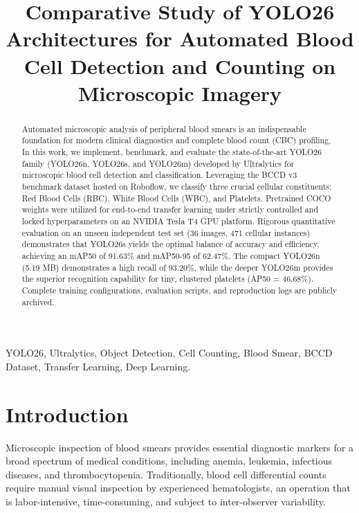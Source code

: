 \documentclass[conference]{IEEEtran}
\begin{document}
\title{Comparative Study of YOLO26 Architectures for Automated Blood Cell Detection and Counting on Microscopic Imagery}

\author{
}

\maketitle

\begin{abstract}
Automated microscopic analysis of peripheral blood smears is an indispensable foundation for modern clinical diagnostics and complete blood count (CBC) profiling. In this work, we implement, benchmark, and evaluate the state-of-the-art YOLO26 family (YOLO26n, YOLO26s, and YOLO26m) developed by Ultralytics for microscopic blood cell detection and classification. Leveraging the BCCD v3 benchmark dataset hosted on Roboflow, we classify three crucial cellular constituents: Red Blood Cells (RBC), White Blood Cells (WBC), and Platelets. Pretrained COCO weights were utilized for end-to-end transfer learning under strictly controlled and locked hyperparameters on an NVIDIA Tesla T4 GPU platform. Rigorous quantitative evaluation on an unseen independent test set (36 images, 471 cellular instances) demonstrates that YOLO26s yields the optimal balance of accuracy and efficiency, achieving an mAP50 of 91.63\% and mAP50-95 of 62.47\%. The compact YOLO26n (5.19 MB) demonstrates a high recall of 93.20\%, while the deeper YOLO26m provides the superior recognition capability for tiny, clustered platelets (AP50 = 46.68\%). Complete training configurations, evaluation scripts, and reproduction logs are publicly archived.
\end{abstract}

\begin{IEEEkeywords}
YOLO26, Ultralytics, Object Detection, Cell Counting, Blood Smear, BCCD Dataset, Transfer Learning, Deep Learning.
\end{IEEEkeywords}

\section{Introduction}
Microscopic inspection of blood smears provides essential diagnostic markers for a broad spectrum of medical conditions, including anemia, leukemia, infectious diseases, and thrombocytopenia. Traditionally, blood cell differential counts require manual visual inspection by experienced hematologists, an operation that is labor-intensive, time-consuming, and subject to inter-observer variability.
\end{document}
